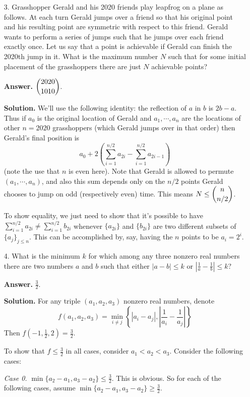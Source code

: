 \documentclass[11pt,a4paper]{article}
\begin{document}
\begin{enumerate}
	\item[3.]
	Grasshopper Gerald and his 2020 friends play leapfrog on a plane as follows. At each turn
	Gerald jumps over a friend so that his original point and his resulting point are symmetric
	with respect to this friend. Gerald wants to perform a series of jumps such that he jumps
	over each friend exactly once. Let us say that a point is achievable if Gerald can finish the
	2020th jump in it. What is the maximum number $N$ such that for some initial placement of
	the grasshoppers there are just $N$ achievable points?
	
	\textbf{Answer.} $\dbinom{2020}{1010}$. 
	
	\textbf{Solution.} We'll use the following identity: the reflection of $a$ in $b$ is $2b-a$. 
	Thus if $a_0$ is the original location of Gerald and 
	$a_1, \cdots, a_n$ are the locations of other $n=2020$ grasshoppers (which Gerald jumps over in that order) 
	then Gerald's final position is 
	\[
	a_0 + 2\left(\sum_{i=1}^{n/2}a_{2i} - \sum_{i=1}^{n/2}a_{2i-1}\right)
	\]
	(note the use that $n$ is even here). 
	Note that Gerald is allowed to permute $(a_1, \cdots, a_n)$, 
	and also this sum depends only on the $n/2$ points Gerald chooses to jump on odd (respectively even) time. 
	This means $N\le \dbinom{n}{n/2}$. 
	
	To show equality, we just need to show that it's possible to have $\sum_{i=1}^{n/2}a_{2i}\neq \sum_{i=1}^{n/2}b_{2i}$ whenever $\{a_{2i}\}$ and $\{b_{2i}\}$ are two different subsets of 
	$\{a_j\}_{j\le n}$. 
	This can be accomplished by, say, having the $n$ points to be $a_i = 2^i$. 
	
	
	\item[4.]
	What is the minimum $k$ for which among any three nonzero real numbers there are two
	numbers $a$ and $b$ such that either $|a-b|\le k$ or $|\frac{1}{a}-\frac{1}{b}|\le k$? 
	
	\textbf{Answer.} $\frac 32$. 
	
	\textbf{Solution.} 
	For any triple $(a_1, a_2, a_3)$ nonzero real numbers, denote 
	\[
	f(a_1, a_2, a_3) = \min_{i\neq j}\left\{|a_i-a_j|, |\frac{1}{a_i}-\frac{1}{a_j}|\right\}
	\]
	Then $f(-1, \frac 12, 2)=\frac 32$. 
	
	To show that $f\le \frac 32$ in all cases, 
	consider $a_1<a_2<a_3$. 
	Consider the following cases: 
	
	\emph{Case 0.} $\min \{a_2-a_1, a_3-a_2\}\le \frac 32$. This is obvious. 
	So for each of the following cases, assume $\min \{a_2-a_1, a_3-a_2\}\ge \frac 32$. 
	

\end{enumerate}
\end{document}
